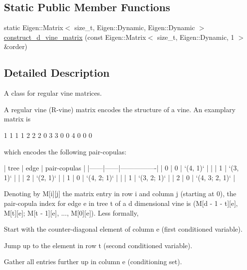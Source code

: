 \subsection*{Static Public Member Functions}
\begin{DoxyCompactItemize}
\item 
static Eigen\+::\+Matrix$<$ size\+\_\+t, Eigen\+::\+Dynamic, Eigen\+::\+Dynamic $>$ \hyperlink{classvinecopulib_1_1_r_vine_matrix_ad523b84e2ea41eba4eb982eb9b39471b}{construct\+\_\+d\+\_\+vine\+\_\+matrix} (const Eigen\+::\+Matrix$<$ size\+\_\+t, Eigen\+::\+Dynamic, 1 $>$ \&order)
\end{DoxyCompactItemize}


\subsection{Detailed Description}
A class for regular vine matrices. 

A regular vine (R-\/vine) matrix encodes the structure of a vine. An examplary matrix is 
\begin{DoxyCode}
1 1 1 1
2 2 2 0
3 3 0 0
4 0 0 0
\end{DoxyCode}
 which encodes the following pair-\/copulas\+: 
\begin{DoxyCode}
| tree | edge | pair-copulas   |
|------|------|----------------|
| 0    | 0    | `(4, 1)`       |
|      | 1    | `(3, 1)`       |
|      | 2    | `(2, 1)`       |
| 1    | 0    | `(4, 2; 1)`    |
|      | 1    | `(3, 2; 1)`    |
| 2    | 0    | `(4, 3; 2, 1)` |
\end{DoxyCode}
 Denoting by {\ttfamily M\mbox{[}i\mbox{]}\mbox{[}j\mbox{]}} the matrix entry in row {\ttfamily i} and column {\ttfamily j} (starting at 0), the pair-\/copula index for edge {\ttfamily e} in tree {\ttfamily t} of a {\ttfamily d} dimensional vine is {\ttfamily (M\mbox{[}d -\/ 1 -\/ t\mbox{]}\mbox{[}e\mbox{]}, M\mbox{[}t\mbox{]}\mbox{[}e\mbox{]}; M\mbox{[}t -\/ 1\mbox{]}\mbox{[}e\mbox{]}, ..., M\mbox{[}0\mbox{]}\mbox{[}e\mbox{]})}. Less formally,
\begin{DoxyEnumerate}
\item Start with the counter-\/diagonal element of column {\ttfamily e} (first conditioned variable).
\item Jump up to the element in row {\ttfamily t} (second conditioned variable).
\item Gather all entries further up in column {\ttfamily e} (conditioning set).
\end{DoxyEnumerate}

